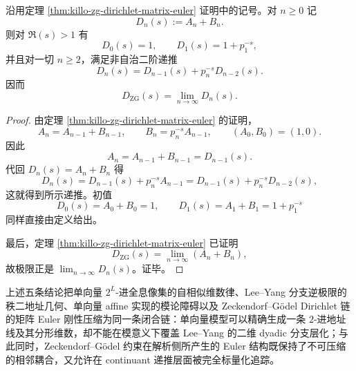 \begin{theorem}\label{thm:xi-time-part62b-zg-matrix-euler-continuant}
沿用定理 \ref{thm:killo-zg-dirichlet-matrix-euler} 证明中的记号。对 \(n\ge 0\) 记
\[
D_n(s):=A_n+B_n.
\]
则对 \(\Re(s)>1\) 有
\[
D_0(s)=1,
\qquad
D_1(s)=1+p_1^{-s},
\]
并且对一切 \(n\ge 2\)，满足非自治二阶递推
\[
D_n(s)=D_{n-1}(s)+p_n^{-s}D_{n-2}(s).
\]
因而
\[
D_{\mathrm{ZG}}(s)=\lim_{n\to\infty}D_n(s).
\]
\end{theorem}
\begin{proof}
由定理 \ref{thm:killo-zg-dirichlet-matrix-euler} 的证明，
\[
A_n=A_{n-1}+B_{n-1},
\qquad
B_n=p_n^{-s}A_{n-1},
\qquad
(A_0,B_0)=(1,0).
\]
因此
\[
A_n=A_{n-1}+B_{n-1}=D_{n-1}(s).
\]
代回 \(D_n(s)=A_n+B_n\) 得
\[
D_n(s)
=
D_{n-1}(s)+p_n^{-s}A_{n-1}
=
D_{n-1}(s)+p_n^{-s}D_{n-2}(s),
\]
这就得到所示递推。初值
\[
D_0(s)=A_0+B_0=1,
\qquad
D_1(s)=A_1+B_1=1+p_1^{-s}
\]
同样直接由定义给出。

最后，定理 \ref{thm:killo-zg-dirichlet-matrix-euler} 已证明
\[
D_{\mathrm{ZG}}(s)=\lim_{n\to\infty}(A_n+B_n),
\]
故极限正是 \(\lim_{n\to\infty}D_n(s)\)。证毕。
\end{proof}

\noindent
上述五条结论把单向量 \(2^L\)-进全息像集的自相似维数律、Lee--Yang 分支逆极限的秩二地址几何、单向量 affine 实现的模论障碍以及 Zeckendorf--Gödel Dirichlet 链的矩阵 Euler 刚性压缩为同一条闭合链：单向量模型可以精确生成一条 \(2\)-进地址线及其分形维数，却不能在模意义下覆盖 Lee--Yang 的二维 dyadic 分支层化；与此同时，Zeckendorf--Gödel 约束在解析侧所产生的 Euler 结构既保持了不可压缩的相邻耦合，又允许在 continuant 递推层面被完全标量化追踪。

\endinput

